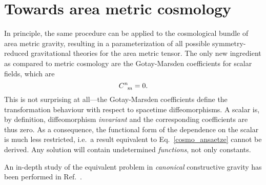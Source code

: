 \section{Towards area metric cosmology}

In principle, the same procedure can be applied to the cosmological bundle of area metric gravity, resulting in a parameterization of all possible symmetry-reduced gravitational theories for the area metric tensor. The only new ingredient as compared to metric cosmology are the Gotay-Marsden coefficients for scalar fields, which are
\begin{equation}
  \gmc{}{}{n}{m} = 0.
\end{equation}
This is not surprising at all---the Gotay-Marsden coefficients define the transformation behaviour with respect to spacetime diffeomorphisms. A scalar is, by definition, diffeomorphism \emph{invariant} and the corresponding coefficients are thus zero. As a consequence, the functional form of the dependence on the scalar is much less restricted, i.e.\ a result equivalent to Eq.~\eqref{cosmo_ansaetze} cannot be derived. Any solution will contain undetermined \emph{functions}, not only constants.

An in-depth study of the equivalent problem in \emph{canonical} constructive gravity has been performed in Ref.~\cite{Duell_2020}.

